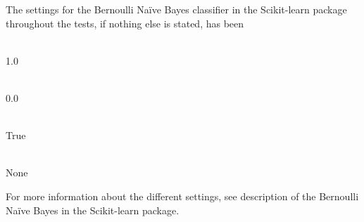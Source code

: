 The settings for the Bernoulli Naïve Bayes classifier in the Scikit-learn package throughout the tests, if nothing else is stated, has been
\begin{description}
	\item[Alpha] \ \\1.0
	\item[Binarize] \ \\0.0
	\item[Fit prior]\ \\ True
	\item[Class prior] \ \\None
\end{description}
For more information about the different settings, see description of the Bernoulli Naïve Bayes in the Scikit-learn package.